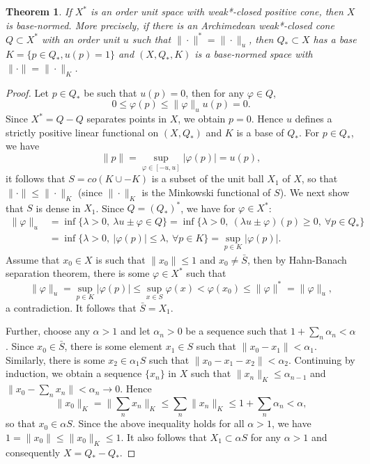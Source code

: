 \documentclass[12pt]{article}
\newtheorem{thm}{Theorem}
\theoremstyle{remark}
\newcommand{\<}{\langle}
\begin{document}
\begin{thm}\cite{ellis, asell} If $X^*$ is an order unit space with weak*-closed positive cone, then $X$ is base-normed. More precisely, 
if there is an Archimedean weak*-closed cone $Q\subset X^*$ with an order unit $u$  such that $\|\cdot\|^*=\|\cdot\|_u$, 
 then  $Q_*\subset X$ has a base $K=\{p\in Q_*, u(p)=1\}$ and $(X,Q_*,K)$ is a base-normed 
space with $\|\cdot\|=\|\cdot\|_K$.

\end{thm}

\begin{proof}
Let $p\in Q_*$ be such that $u(p)=0$, then for any $\varphi\in Q$, 
\[
0\le \varphi(p)\le \|\varphi\|_uu(p)=0.
\]
Since  $X^*=Q-Q$ separates points in $X$, we obtain $p=0$. Hence 
$u$ defines a strictly positive linear functional on $(X,Q_*)$  and $K$ is a base of $Q_*$. 
For $p\in Q_*$, we have
\[
\|p\|=\sup_{\varphi\in [-u,u]}|\varphi(p)|=u(p),
\]
it follows that $S=co(K\cup -K)$ is a subset of the unit ball $X_1$ of $X$, so that $\|\cdot\|\le \|\cdot\|_K$ (since $\|\cdot\|_K$ is the Minkowski functional of $S$).   We next show that $S$ is dense in $X_1$. Since $Q=(Q_*)^*$, we have for $\varphi\in X^*$:
\begin{align*}
\|\varphi\|_u&=\inf\{\lambda >0,\ \lambda u\pm \varphi\in Q\}=\inf\{\lambda >0,\ (\lambda u\pm \varphi)(p)\ge 0,\ \forall p \in Q_*\}\\
&= \inf\{\lambda>0,\ |\varphi(p)|\le \lambda,\ \forall p\in K\}=\sup_{p\in K}|\varphi(p)|.
\end{align*}
Assume that $x_0\in X$ is such that $\|x_0\|\le 1$ and $x_0\ne \bar S$, then by Hahn-Banach separation theorem, there is some $\varphi\in X^*$ such that 
\[
\|\varphi\|_u=\sup_{p\in K}|\varphi(p)|\le \sup_{x\in S}\varphi(x)< \varphi(x_0)\le \|\varphi\|^*=\|\varphi\|_u,
\]
a contradiction. It follows that $\bar S=X_1$.  

Further, choose any $\alpha>1$ and let $\alpha_n>0$ be a sequence such that  $1+\sum_n\alpha_n<\alpha$. Since $x_0\in \bar S$, there is some element $x_1\in S$ such that $\|x_0-x_1\|< \alpha_1$. Similarly, there is some $x_2\in \alpha_1S$ 
such that $\|x_0-x_1-x_2\|<\alpha_2$. Continuing by induction, we obtain a sequence $\{x_n\}$ in $X$ such that $\|x_n\|_K\le \alpha_{n-1}$ and  $\|x_0-\sum_n x_n\|<\alpha_n\to 0$. Hence  
\[
\|x_0\|_K=\|\sum_n x_n\|_K\le \sum_n\|x_n\|_K\le 1+\sum_n\alpha_n<\alpha,
\]
so that  $x_0\in \alpha S$. Since the above inequality holds for all $\alpha>1$, we have
$1=\|x_0\|\le \|x_0\|_K\le 1$. It also  follows that  $X_1\subset \alpha S$ for any $\alpha>1$ and consequently $X=Q_*-Q_*$. 





\end{proof}
\end{document}
